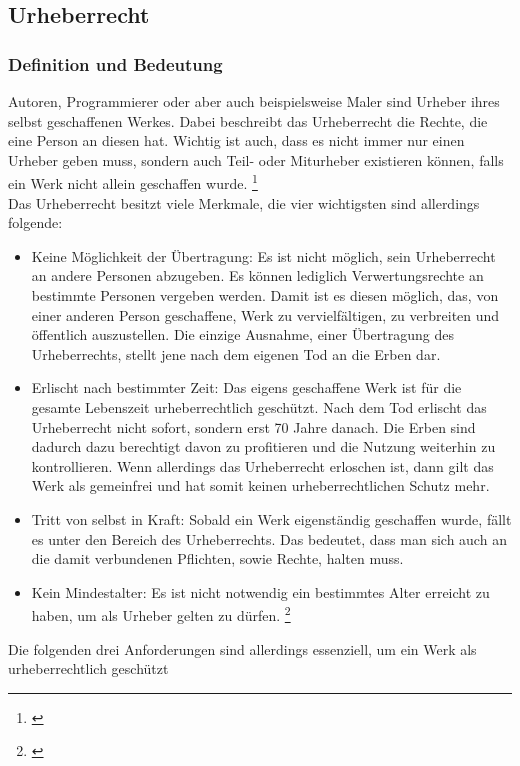 \documentclass[titlepage,12pt,twoside]{article}
\begin{document}
\subsection{Urheberrecht}
\subsubsection{Definition und Bedeutung}
Autoren, Programmierer oder aber auch beispielsweise Maler sind Urheber ihres selbst geschaffenen Werkes. 
Dabei beschreibt das Urheberrecht die Rechte, die eine Person an diesen hat. Wichtig ist auch, dass es nicht 
immer nur einen Urheber geben muss, sondern auch Teil- oder Miturheber existieren können, falls ein Werk 
nicht allein geschaffen wurde. \footnote{\cite{Saferinternet.p7}} \\
Das Urheberrecht besitzt viele Merkmale, die vier wichtigsten sind allerdings folgende: \\
\begin{itemize}
	\item Keine Möglichkeit der Übertragung: Es ist nicht möglich, sein Urheberrecht an andere Personen 
	abzugeben. Es können lediglich Verwertungsrechte an bestimmte Personen vergeben werden. Damit ist es 
	diesen möglich, das, von einer anderen Person geschaffene, Werk zu vervielfältigen, zu verbreiten und 
	öffentlich auszustellen. Die einzige Ausnahme, einer Übertragung des Urheberrechts, stellt jene nach dem 
	eigenen Tod an die Erben dar.
	\item Erlischt nach bestimmter Zeit: Das eigens geschaffene Werk ist für die gesamte Lebenszeit 
	urheberrechtlich geschützt. Nach dem Tod erlischt das Urheberrecht nicht sofort, sondern erst 70 Jahre 
	danach. Die Erben sind dadurch dazu berechtigt davon zu profitieren und die Nutzung weiterhin zu 
	kontrollieren. Wenn allerdings das Urheberrecht erloschen ist, dann gilt das Werk als gemeinfrei und hat 
	somit keinen urheberrechtlichen Schutz mehr.
	\item Tritt von selbst in Kraft: Sobald ein Werk eigenständig geschaffen wurde, fällt es unter den Bereich 
	des Urheberrechts. Das bedeutet, dass man sich auch an die damit verbundenen Pflichten, sowie Rechte, 
	halten muss.
	\item Kein Mindestalter: Es ist nicht notwendig ein bestimmtes Alter erreicht zu haben, um als Urheber 
	gelten zu dürfen. \footnote{\cite{Saferinternet.p7}} \\
\end{itemize}
\hfill \break
Die folgenden drei Anforderungen sind allerdings essenziell, um ein Werk als urheberrechtlich geschützt 
\end{document}
